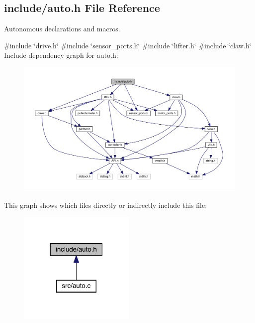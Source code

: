 \subsection{include/auto.h File Reference}
\label{auto_8h}


Autonomous declarations and macros.  


{\ttfamily \#include \char`\"{}drive.\+h\char`\"{}}\newline
{\ttfamily \#include \char`\"{}sensor\+\_\+ports.\+h\char`\"{}}\newline
{\ttfamily \#include \char`\"{}lifter.\+h\char`\"{}}\newline
{\ttfamily \#include \char`\"{}claw.\+h\char`\"{}}\newline
Include dependency graph for auto.\+h\+:\nopagebreak
\begin{figure}[H]
\begin{center}
\leavevmode
\includegraphics[width=350pt]{auto_8h__incl}
\end{center}
\end{figure}
This graph shows which files directly or indirectly include this file\+:\nopagebreak
\begin{figure}[H]
\begin{center}
\leavevmode
\includegraphics[width=158pt]{auto_8h__dep__incl}
\end{center}
\end{figure}
